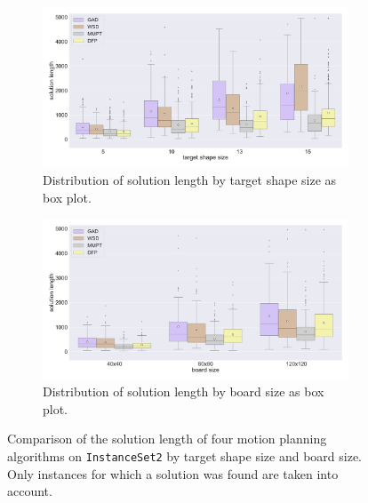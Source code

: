 \begin{figure}[htpb]
\begin{subfigure}[b]{\textwidth}
\centering
\includegraphics[width=\textwidth]{figures/plots/heuristic_solvers_i2/i2_solution_length_over_target_size.pdf}
\caption{Distribution of solution length by target shape size as box plot.}
\label{fig:i2_solution_length_over_tiles}
\end{subfigure}
\begin{subfigure}[b]{\textwidth}
\centering
\includegraphics[width=\textwidth]{figures/plots/heuristic_solvers_i2/i2_solution_length_over_board_size.pdf}
\caption{Distribution of solution length by board size as box plot.}
\label{fig:i2_solution_length_over_board_size}
\end{subfigure}
\caption[Solution lengths for several planners on \texttt{InstanceSet2}]{Comparison of the solution length of four motion planning algorithms on \texttt{InstanceSet2} by target shape size and board size. Only instances for which a solution was found are taken into account.}
\label{fig:i2_performance3}
\end{figure}

